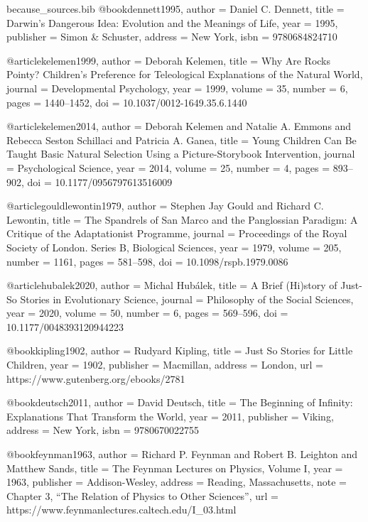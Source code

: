 \begin{filecontents*}{because_sources.bib}
@book{dennett1995,
  author    = {Daniel C. Dennett},
  title     = {Darwin's Dangerous Idea: Evolution and the Meanings of Life},
  year      = {1995},
  publisher = {Simon \& Schuster},
  address   = {New York},
  isbn      = {9780684824710}
}

@article{kelemen1999,
  author  = {Deborah Kelemen},
  title   = {Why Are Rocks Pointy? Children's Preference for Teleological Explanations of the Natural World},
  journal = {Developmental Psychology},
  year    = {1999},
  volume  = {35},
  number  = {6},
  pages   = {1440--1452},
  doi     = {10.1037/0012-1649.35.6.1440}
}

@article{kelemen2014,
  author  = {Deborah Kelemen and Natalie A. Emmons and Rebecca Seston Schillaci and Patricia A. Ganea},
  title   = {Young Children Can Be Taught Basic Natural Selection Using a Picture-Storybook Intervention},
  journal = {Psychological Science},
  year    = {2014},
  volume  = {25},
  number  = {4},
  pages   = {893--902},
  doi     = {10.1177/0956797613516009}
}

@article{gouldlewontin1979,
  author  = {Stephen Jay Gould and Richard C. Lewontin},
  title   = {The Spandrels of San Marco and the Panglossian Paradigm: A Critique of the Adaptationist Programme},
  journal = {Proceedings of the Royal Society of London. Series B, Biological Sciences},
  year    = {1979},
  volume  = {205},
  number  = {1161},
  pages   = {581--598},
  doi     = {10.1098/rspb.1979.0086}
}

@article{hubalek2020,
  author  = {Michal Hub\'alek},
  title   = {A Brief (Hi)story of Just-So Stories in Evolutionary Science},
  journal = {Philosophy of the Social Sciences},
  year    = {2020},
  volume  = {50},
  number  = {6},
  pages   = {569--596},
  doi     = {10.1177/0048393120944223}
}

@book{kipling1902,
  author    = {Rudyard Kipling},
  title     = {Just So Stories for Little Children},
  year      = {1902},
  publisher = {Macmillan},
  address   = {London},
  url       = {https://www.gutenberg.org/ebooks/2781}
}

@book{deutsch2011,
  author    = {David Deutsch},
  title     = {The Beginning of Infinity: Explanations That Transform the World},
  year      = {2011},
  publisher = {Viking},
  address   = {New York},
  isbn      = {9780670022755}
}

@book{feynman1963,
  author    = {Richard P. Feynman and Robert B. Leighton and Matthew Sands},
  title     = {The Feynman Lectures on Physics, Volume I},
  year      = {1963},
  publisher = {Addison-Wesley},
  address   = {Reading, Massachusetts},
  note      = {Chapter 3, ``The Relation of Physics to Other Sciences''},
  url       = {https://www.feynmanlectures.caltech.edu/I_03.html}
}


\end{filecontents*}

